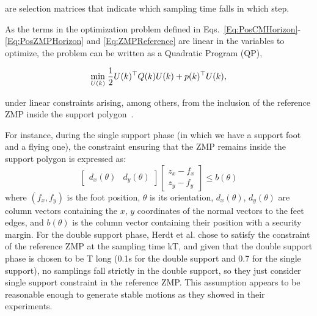 are selection matrices that indicate which sampling time falls in which step.

As the terms in the optimization problem defined in Eqs.~\ref{Eq:PosCMHorizon}-\ref{Eq:PosZMPHorizon} and \ref{Eq:ZMPReference} are linear in the variables to optimize, the problem can be written as a Quadratic Program (QP),

\begin{equation}
 \underset{U(k)}{\min} \; \dfrac{1}{2} U(k)^{\top} Q(k) U(k) + p(k)^{\top} U(k),
\label{Eq:QP}
\end{equation}

under linear constraints arising, among others, from the inclusion of the reference ZMP inside the support polygon~\citep{HerdtAR2010}.

For instance, during the single support phase (in which we have a support foot and a flying one), the constraint ensuring that the ZMP remains inside the support polygon is expressed as:
\begin{equation}
  \begin{bmatrix} d_x(\theta) & d_y(\theta) \end{bmatrix}
  \begin{bmatrix} z_x - f_x \\ z_y - f_y \end{bmatrix} \leq b(\theta)
\end{equation}
where $(f_x,f_y)$ is the foot position, $\theta$ is its orientation,
$d_x(\theta)$, $d_y(\theta)$ are column vectors containing the $x$,
$y$ coordinates of the normal vectors to the feet edges, and $b(\theta)$  is the column vector containing their position with a security margin. For the double support phase, Herdt et al. chose to satisfy the constraint of the reference ZMP at the sampling time kT, and given that the double support phase is chosen to be T long (0.1s for the double support and 0.7 for the single support), no samplings fall strictly in the double support, so they just consider single support constraint in the reference ZMP. This assumption appears to be reasonable enough to generate stable motions as they showed in their experiments.